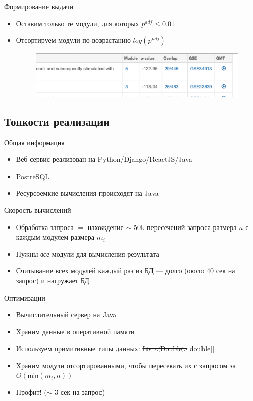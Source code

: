 \documentclass[10pt,pdf,utf8,russian,aspectratio=169]{beamer}
\begin{document}
\begin{frame}{Формирование выдачи}
  \begin{itemize}[<+->]
    \item Оставим только те модули, для которых $p^{adj} \le 0.01$
    \item Отсортируем модули по возрастанию $log(p^{adj})$
        \begin{figure}[!ht]
            \centering
            \includegraphics[width=\textwidth]{./img/screen_p_value.png}
        \end{figure}
  \end{itemize}
\end{frame}

\subsection{Тонкости реализации}

\begin{frame}{Общая информация}
  \begin{itemize}[<+->]
    \item Веб-сервис реализован на Python/Django/ReactJS/Java
    \item PostreSQL
    \item Ресурсоемкие вычисления происходят на Java
  \end{itemize}
\end{frame}

\begin{frame}{Скорость вычислений}
  \begin{itemize}[<+->]
    \item Обработка запроса $=$ нахождение $\sim$ 50k пересечений запроса размера $n$ с каждым модулем размера $m_i$
    \item Нужны \emph{все} модули для вычисления результата
    \item Считывание всех модулей каждый раз из БД --- долго (около 40 сек на запрос) и нагружает БД
  \end{itemize}
\end{frame}

\begin{frame}{Оптимизации}
  \begin{itemize}[<+->]
    \item Вычислительный сервер на Java
    \item Храним данные в оперативной памяти
    \item Используем примитивные типы данных: \sout{List<Double>} double[]
    \item Храним модули отсортированными, чтобы пересекать их с запросом за $O(\mathsf{min}(m_i, n))$
    \item Профит! ($\sim$ 3 сек на запрос)
  \end{itemize}
\end{frame}
\end{document}
